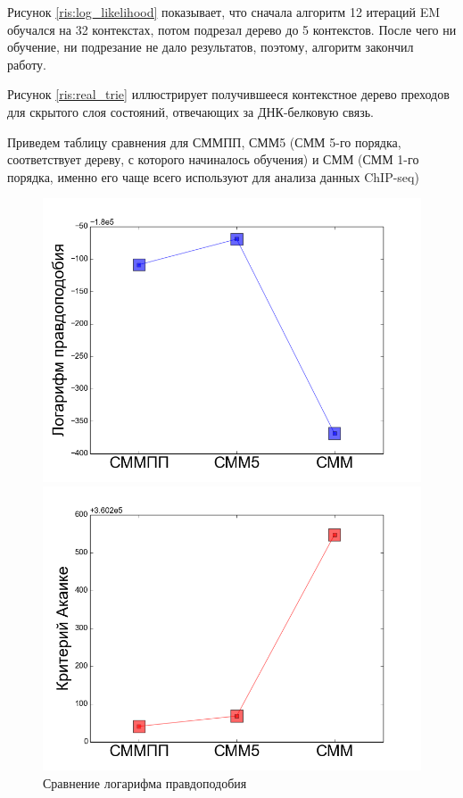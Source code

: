 \documentclass{matmex-diploma-custom}
\begin{document}
Рисунок \ref{ris:log_likelihood} показывает, что сначала алгоритм 12 итераций EM обучался на 32 контекстах, потом подрезал дерево до 5 контекстов. После чего ни обучение, ни подрезание не дало результатов, поэтому, алгоритм закончил работу.

Рисунок \ref{ris:real_trie} иллюстрирует получившееся контекстное дерево преходов для скрытого слоя состояний, отвечающих за ДНК-белковую связь.

Приведем таблицу сравнения для СММПП, СММ5 (СММ 5-го порядка, соответствует дереву, с которого начиналось обучения) и СММ (СММ 1-го порядка, именно его чаще всего используют для анализа данных ChIP-seq)
\begin{figure}[h!]\centering
\begin{minipage}[b]{0.32 \textwidth}
	\includegraphics[scale=0.28]{img/real/log_p.png}
	\centering
	\caption{ Сравнение логарифма правдоподобия}
	\label{ris:real_comp_log_p}
\end{minipage}
\hfill
\begin{minipage}[b]{0.32 \textwidth}
	\includegraphics[scale=0.28]{img/real/aic.png}

\end{minipage}
\end{figure}
\end{document}
